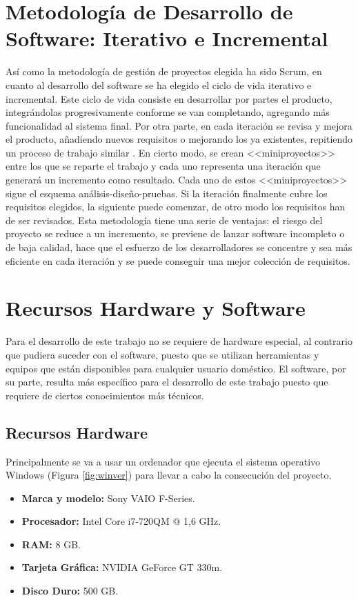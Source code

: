 \section{Metodología de Desarrollo de Software: Iterativo e Incremental}
Así como la metodología de gestión de proyectos elegida ha sido Scrum, en cuanto al desarrollo del software se ha elegido el ciclo de vida iterativo e incremental. Este ciclo de vida consiste en desarrollar por partes el producto, integrándolas progresivamente conforme se van completando, agregando más funcionalidad al sistema final. Por otra parte, en cada iteración se revisa y mejora el producto, añadiendo nuevos requisitos o mejorando los ya existentes, repitiendo un proceso de trabajo similar \cite{proyectosagiles.org}. En cierto modo, se crean <<miniproyectos>> entre los que se reparte el trabajo y cada uno representa una iteración que generará un incremento como resultado. Cada uno de estos <<miniproyectos>> sigue el esquema análisis-diseño-pruebas. Si la iteración finalmente cubre los requisitos elegidos, la siguiente puede comenzar, de otro modo los requisitos han de ser revisados. Esta metodología tiene una serie de ventajas: el riesgo del proyecto se reduce a un incremento, se previene de lanzar software incompleto o de baja calidad, hace que el esfuerzo de los desarrolladores se concentre y sea más eficiente en cada iteración y se puede conseguir una mejor colección de requisitos.

\section{Recursos Hardware y Software}
Para el desarrollo de este trabajo no se requiere de hardware especial, al contrario que pudiera suceder con el software, puesto que se utilizan herramientas y equipos que están disponibles para cualquier usuario doméstico. El software, por su parte, resulta más específico para el desarrollo de este trabajo puesto que requiere de ciertos conocimientos más técnicos.

\newpage

\subsection{Recursos Hardware}
Principalmente se va a usar un ordenador que ejecuta el sistema operativo Windows (Figura \ref{fig:winver}) para llevar a cabo la consecución del proyecto.

\begin{itemize}
	\item \textbf{Marca y modelo:} Sony VAIO F-Series.
	\item \textbf{Procesador:} Intel\textregistered{ } Core\texttrademark{ } i7-720QM @ 1,6 \acf{GHz}.
	\item \textbf{RAM:} 8 \acf{GB}.
	\item \textbf{Tarjeta Gráfica:} NVIDIA GeForce GT 330m.
	\item \textbf{Disco Duro:} 500 \acs{GB}.
\end{itemize}

